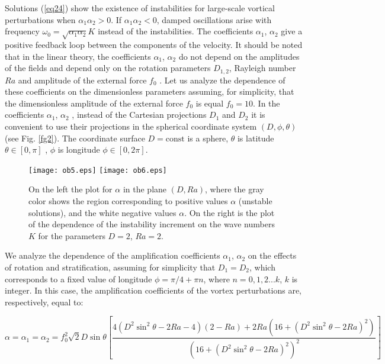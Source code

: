 \documentclass [12pt]{article}
\begin{document}
Solutions (\ref{eq24}) show the existence of instabilities for large-scale vortical perturbations when $\alpha _{1} \alpha _{2} >0$. If $\alpha _{1} \alpha _{2} <0$, damped oscillations arise with frequency $\omega _{0} =\sqrt{\alpha _{1} \alpha _{2} } K$ instead of the instabilities. The coefficients  $\alpha _{1} $,  $\alpha _{2} $  give a positive feedback loop between the components of the velocity. It should be noted that in the linear theory, the coefficients $\alpha _{1} $, $\alpha _{2} $  do not depend on the amplitudes of the fields and depend only on the rotation parameters  $D_{1,2}$, Rayleigh number  $Ra$  and amplitude of the external force $f_{0} $ . Let us analyze the dependence of these coefficients on the dimensionless parameters assuming, for simplicity, that the dimensionless amplitude of the external force $f_{0} $ is equal $f_{0} =10$.  In the coefficients $\alpha _{1} $,  $\alpha _{2} $ , instead of the Cartesian projections $D_{1} $ and $D_{2} $ it is convenient to use their projections in  the spherical coordinate system  $(D,\phi ,\theta )$ (see Fig. \ref{fg2}). The coordinate surface $D=\textrm{const}$ is a sphere, $\theta $ is latitude $\theta \in [0, \pi ]$ , $\phi $ is longitude  $\phi \in [0, 2\pi ]$.

\begin{figure}
  \centering
  \texttt{[image: ob5.eps]}
  \texttt{[image: ob6.eps]}\\
  \caption {On the left the plot for $\alpha $ in the plane $(D,Ra)$, where the gray color shows the region corresponding to positive values $\alpha $ (unstable solutions), and the white negative values $\alpha $. On the right is the plot of the dependence of the instability increment on the wave numbers $K$ for the parameters $D=2$, $Ra=2$.} \label{fg4}
\end{figure}

We analyze the dependence of the amplification coefficients $\alpha _{1} $, $\alpha _{2} $ on the effects of rotation and stratification, assuming for simplicity that $D_{1} =D_{2} $, which corresponds to a fixed value of longitude $\phi =\pi /4+\pi n$, where $n=0,1,2...k$, $k$ is integer. In this case, the amplification coefficients of the vortex perturbations are, respectively, equal to:

\[\alpha =\alpha _{1} =\alpha _{2}  = f_0^2 \sqrt 2 D\sin \theta \left[ {\frac{{4(D^2 \sin ^2 \theta  - 2Ra - 4)(2 - Ra) + 2Ra(16 + (D^2 \sin ^2 \theta  - 2Ra)^2 )}}{{(16 + (D^2 \sin ^2 \theta  - 2Ra)^2 )^2 }}} \right] \]
\end{document}
